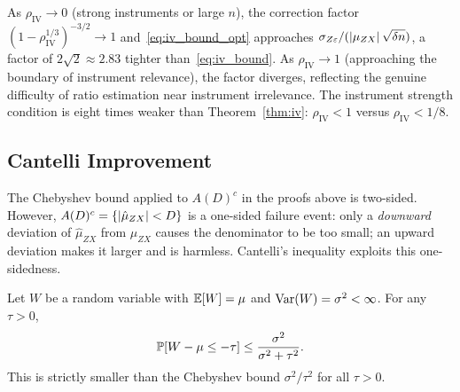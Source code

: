 \begin{remark}
\label{rem:iv_opt_compare}
    As $\rho_\mathrm{IV}\to 0$ (strong instruments or large $n$), the correction factor $(1-\rho_\mathrm{IV}^{1/3})^{-3/2}\to 1$ and~\eqref{eq:iv_bound_opt} approaches $\sigma_{Z\varepsilon}/(\left|\mu_{ZX}\right|\sqrt{\delta n})$, a factor of $2\sqrt{2}\approx 2.83$ tighter than~\eqref{eq:iv_bound}. As $\rho_\mathrm{IV}\to 1$ (approaching the boundary of instrument relevance), the factor diverges, reflecting the genuine difficulty of ratio estimation near instrument irrelevance. The instrument strength condition is eight times weaker than Theorem~\ref{thm:iv}: $\rho_\mathrm{IV} < 1$ versus $\rho_\mathrm{IV} < 1/8$.
\end{remark}


\subsection{Cantelli Improvement}
\label{sec:iv_cantelli}

The Chebyshev bound applied to $A(D)^c$ in the proofs above is two-sided. However, $A(D)^c = \{\left|\hat{\mu}_{ZX}\right| < D\}$ is a one-sided failure event: only a \emph{downward} deviation of $\hat{\mu}_{ZX}$ from $\mu_{ZX}$ causes the denominator to be too small; an upward deviation makes it larger and is harmless. Cantelli's inequality exploits this one-sidedness.

\begin{lemma}
    \label{lem:cantelli}
    Let $W$ be a random variable with $\operatorname{\mathbb{E}}[W]=\mu$ and $\operatorname{Var}(W)=\sigma^2<\infty$.
    For any $\tau>0$,
    \[
        \operatorname{\mathbb{P}}[W - \mu \leq -\tau] \leq \frac{\sigma^2}{\sigma^2 + \tau^2}.
    \]
    This is strictly smaller than the Chebyshev bound $\sigma^2/\tau^2$ for all $\tau>0$.
\end{lemma}

